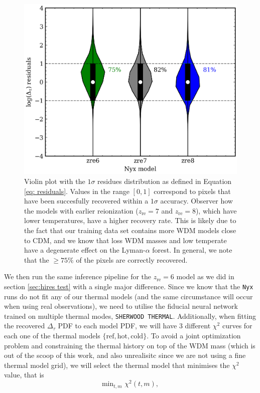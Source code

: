 \begin{figure}
    \centering
    \includegraphics[width=0.8\linewidth]{img/ML/violin_nyx.png}
    \caption{Violin plot with the $1\sigma$ residues distribution as defined in Equation \ref{eq: residuals}. Values in the range $[0,1]$ correspond to pixels that have been succesfully recovered within a $1\sigma$ accuracy. Observer how the models with earlier reionization ($z_\mathrm{re}=7$ and $z_\mathrm{re}=8$), which have lower temperatures, have a higher recovery rate. This is likely due to the fact that our training data set contains more WDM models close to CDM, and we know that loss WDM masses and low temperate have a degenerate effect on the Lyman-$\alpha$ forest. In general, we note that the $\geq 75 \%$ of the pixels are correctly recovered.}
    \label{fig: nyx violin}
\end{figure}
We then run the same inference pipeline for the $z_\mathrm{re}=6$ model as we did in section \ref{sec:hires test} with a single major difference. Since we know that the \texttt{Nyx} runs do not fit any of our thermal models (and the same circumstance will occur when using real observations), we need to utilise the fiducial neural network trained on multiple thermal modes, \texttt{SHERWOOD THERMAL}. Additionally, when fitting the recovered $\Delta_\tau$ PDF to each model PDF, we will have 3 different $\chi^2$ curves for each one of the thermal models $\{\mathrm{ref}, \mathrm{hot}, \mathrm{cold} \}$. To avoid a joint optimization problem and constraining the thermal history on top of the WDM mass (which is out of the scoop of this work, and also unrealisitc since we are not using a fine thermal model grid), we will select the thermal model that minimises the $\chi^2$ value, that is
\begin{equation}\label{eq: chi thermal def}
    \mathrm{min}_{t,m} \, \, \chi^2(t,m),
\end{equation}
